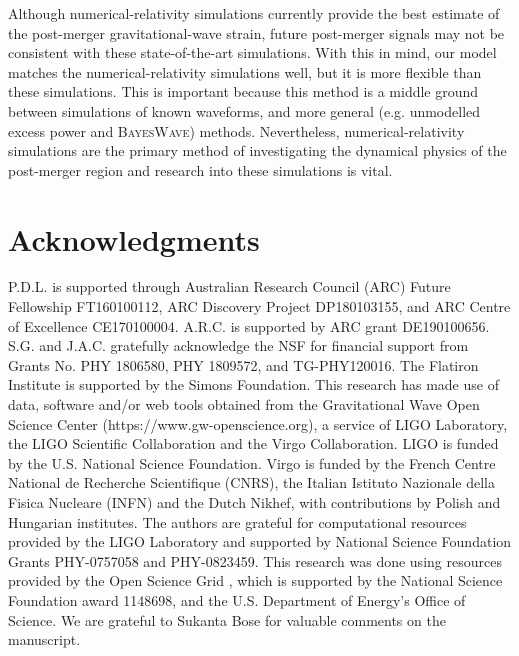 \documentclass[../Thesis.tex]{subfiles}
\begin{document}
    Although numerical-relativity simulations currently provide the best estimate of the post-merger gravitational-wave strain, future post-merger signals may not be consistent with these state-of-the-art simulations.
    With this in mind, our model matches the numerical-relativity simulations well, but it is more flexible than these simulations.
    This is important because this method is a middle ground between  simulations of known waveforms, and more general (e.g. unmodelled excess power and \textsc{BayesWave}) methods. Nevertheless, numerical-relativity simulations are the primary method of investigating the dynamical physics of the post-merger region and  research into these simulations is vital. 
    
\section*{Acknowledgments}
        P.D.L. is supported through Australian Research Council (ARC) Future Fellowship FT160100112, ARC Discovery Project DP180103155, and ARC Centre of Excellence CE170100004. A.R.C. is supported by ARC grant DE190100656. 
        S.G. and J.A.C. gratefully acknowledge the NSF for financial support from Grants No. PHY 1806580, PHY 1809572, and TG-PHY120016.
        The Flatiron Institute is supported by the Simons Foundation. 
        This research has made use of data, software and/or web tools obtained from the Gravitational Wave Open Science Center (https://www.gw-openscience.org), a service of LIGO Laboratory, the LIGO Scientific Collaboration and the Virgo Collaboration. LIGO is funded by the U.S. National Science Foundation. Virgo is funded by the French Centre National de Recherche Scientifique (CNRS), the Italian Istituto Nazionale della Fisica Nucleare (INFN) and the Dutch Nikhef, with contributions by Polish and Hungarian institutes.
        The authors are grateful for computational resources provided by the LIGO Laboratory and supported by National Science Foundation Grants PHY-0757058 and PHY-0823459. 
        This research was done using resources provided by the Open Science Grid \cite{Osg07, Osg09}, which is supported by the National Science Foundation award 1148698, and the U.S. Department of Energy's Office of Science.
        We are grateful to Sukanta Bose for valuable comments on the manuscript.
\end{document}
